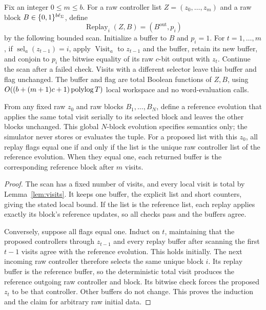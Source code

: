 \begin{lemma}\label{lem:local-replay}
Fix an integer \(0\le m\le b\). For a raw controller list
\(Z=(z_0,\ldots,z_m)\) and a raw block \(B\in\{0,1\}^{b\ell_\Sigma}\),
define
\[
 \operatorname{Replay}_i(Z,B)=(B^{\mathrm{out}},p_i)
\]
by the following bounded scan. Initialize a buffer to \(B\) and
\(p_i=1\). For \(t=1,\ldots,m\), if
\(\operatorname{sel}_a(z_{t-1})=i\), apply
\(\operatorname{Visit}_a\) to \(z_{t-1}\) and the buffer, retain its
new buffer, and conjoin to \(p_i\) the bitwise equality of its raw
\(c\)-bit output with \(z_t\). Continue the scan after a failed check.
Visits with a different selector leave this buffer and flag unchanged.
The buffer and flag are total Boolean functions of \(Z,B\), using
\(O((b+(m+1)c+1)\operatorname{polylog} T)\) local workspace and no word-evaluation
calls.

From any fixed raw \(z_0\) and raw blocks \(B_1,\ldots,B_N\), define a
reference evolution that applies the same total visit serially to its
selected block and leaves the other blocks unchanged. This global
\(N\)-block evolution specifies semantics only; the simulator never
stores or evaluates the tuple. For a proposed list with this \(z_0\),
all replay flags equal one if and only if the list is the unique raw
controller list of the reference evolution. When they equal one, each
returned buffer is the corresponding reference block after \(m\) visits.
\end{lemma}

\begin{proof}
The scan has a fixed number of visits, and every local visit is total
by Lemma~\ref{lem:visits}. It keeps one buffer, the explicit list and
short counters, giving the stated local bound. If the list is the
reference list, each replay applies exactly its block's reference
updates, so all checks pass and the buffers agree.

Conversely, suppose all flags equal one. Induct on \(t\), maintaining
that the proposed controllers through \(z_{t-1}\) and every replay
buffer after scanning the first \(t-1\) visits agree with the reference
evolution. This holds initially. The next incoming raw controller
therefore selects the same unique block \(i\). Its replay buffer is
the reference buffer, so the deterministic total visit produces the
reference outgoing raw controller and block. Its bitwise check forces
the proposed \(z_t\) to be that controller. Other buffers do not
change. This proves the induction and the claim for arbitrary raw
initial data.
\end{proof}

